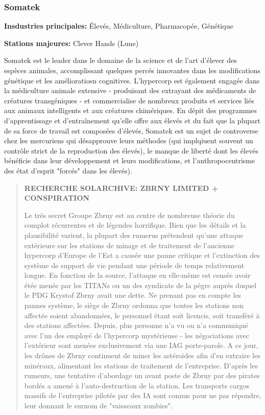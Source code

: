                         \subsubsection{Somatek} \label{sec:somatek} 

                        \textbf{Insdustries principales:} Élevés, Médiculture, Pharmacopée, Génétique 

                        \textbf{Stations majeures:} Clever Hands (Lune) 

                        Somatek est le leader dans le domaine de la science et de l'art d'élever des espèces animales, accomplissant quelques percés innovantes dans les modifications génétique et les amélioratiosn cognitives. L'hypercorp est également engagée dans la médiculture animale extensive - produisant des extrayant des médicaments de créatures transgéniques - et commercialise de nombreux produits et services liés aux animaux intelligents et aux créatures chimériques. En dépit des programmes d'apprentissage et d'entraînement qu'elle offre aux élevés et du fait que la plupart de sa force de travail est composées d'élevés, Somatek est un sujet de controverse chez les mercuriens qui désapprouve leurs méthodes (qui implqiuent souvent un contrôle strict de la reproduction des élevés), le manque de liberté dont les élevés bénéficie dans leur développement et leurs modifications, et l'anthropocentrisme des état d'esprit "forcés" dans les élevés). 

                        \begin{quotation} \textbf{RECHERCHE SOLARCHIVE: ZBRNY LIMITED + CONSPIRATION} 

                           Le trés secret Groupe Zbrny est au centre de nombreuse théorie du complot récurrentes et de légendes horrifique. Bien que les détails et la plausibilité varient, la plupart des rumerus prétendent qu'une attaque extérieure sur les stations de minage et de traitement de l'ancienne hypercorp d'Europe de l'Est a causée une panne critique et l'extinction des système de support de vie pendant une période de temps relativement longue. En fonction de la source, l'attaque en elle-même est censée avoir étée menée par les TITANs ou un des syndicats de la pègre auprès duquel le PDG Krystof Zbrny avait une dette. Ne prenant pas en compte les pannes système, le siège de Zbrny ordonna que toutes les stations non affectée soient abandonnées, le personnel étant soit licencis, soit transféré à des stations affectées. Depuis, plus personne n'a vu ou n'a communiqué avec l'un des employé de l'hypercorp mystérieuse - les négociations avec l'extérieur sont menées exclusivement via une IAG porte-parole. A ce jour, les drônes de Zbrny continuent de miner les astéroïdes afin d'en extraire les minéraux, alimentant les stations de traitement de l'entreprise. D'après les rumeurs, une tentative d'abordage un avant poste de Zbrny par des pirates bordés a amené à l'auto-destruction de la station. Les transports cargos massifs de l'entreprise pilotés par des IA sont connus pour ne pas répondre, leur donnant le surnom de "vaisseaux zombies". \end{quotation} 

